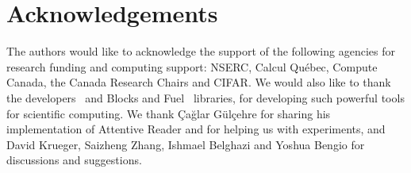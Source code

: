 \documentclass{article} %
\begin{document}
\section*{Acknowledgements}

The authors would like to acknowledge the support of the following agencies for
research funding and computing support: NSERC, Calcul Qu\'{e}bec, Compute Canada,
the Canada Research Chairs and CIFAR.
We would also like to thank the developers~\cite{theano2} and Blocks and Fuel~\cite{blocks} libraries,
for developing such powerful tools for scientific computing.
We thank Çağlar Gülçehre for sharing his implementation of Attentive Reader and for helping us with experiments,
and David Krueger, Saizheng Zhang, Ishmael Belghazi and Yoshua Bengio for discussions and suggestions.



\end{document}
